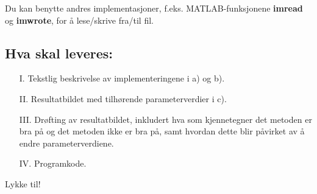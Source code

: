 \documentclass[11pt,a4paper]{article}
\begin{document}
Du kan benytte andres implementasjoner, f.eks. MATLAB-funksjonene \textbf{imread} og
\textbf{imwrote}, for å lese/skrive fra/til fil.

\subsection*{Hva skal leveres:}
\begin{itemize}
\item[I.] Tekstlig beskrivelse av implementeringene i a) og b).
\item[II.] Resultatbildet med tilhørende parameterverdier i c).
\item[III.] Drøfting av resultatbildet, inkludert hva som kjennetegner det metoden er bra
på og det metoden ikke er bra på, samt hvordan dette blir påvirket av å endre
parameterverdiene.
\item[IV.] Programkode.
\end{itemize}
Lykke til!
\end{document}
